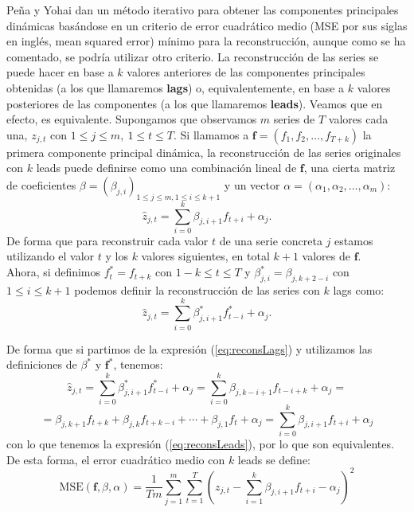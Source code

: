 Peña y Yohai dan un método iterativo para obtener las componentes principales dinámicas basándose en un criterio de error cuadrático medio (MSE por sus siglas en inglés, mean squared error) mínimo para la reconstrucción, aunque como se ha comentado, se podría utilizar otro criterio. La reconstrucción de las series se puede hacer en base a $k$ valores anteriores de las componentes principales obtenidas (a los que llamaremos \textbf{lags}) o, equivalentemente, en base a $k$ valores posteriores de las componentes (a los que llamaremos \textbf{leads}). Veamos que en efecto, es equivalente. Supongamos que observamos $m$ series de $T$ valores cada una, $z_{j,t}$ con $1 \leq j \leq m,\ 1 \leq t \leq T$. Si llamamos a $\mathbf{f} = (f_1, f_2, \dots, f_{T+k})$ la primera componente principal dinámica, la reconstrucción de las series originales con $k$ leads puede definirse como una combinación lineal de $\mathbf{f}$, una cierta matriz de coeficientes $\beta = (\beta_{j,i})_{1 \leq j \leq m, 1 \leq i \leq k+1}$ y un vector $\alpha = (\alpha_1, \alpha_2, \dots, \alpha_m)$:
\begin{equation}\label{eq:reconsLeads}
	\widehat{z}_{j,t} = \sum_{i=0}^k \beta_{j,i+1}f_{t+i} + \alpha_j.
\end{equation}
De forma que para reconstruir cada valor $t$ de una serie concreta $j$ estamos utilizando el valor $t$ y los $k$ valores siguientes, en total $k+1$ valores de $\mathbf{f}$.\\

Ahora, si definimos $f_t^* = f_{t+k}$ con $1-k \leq t \leq T$ y $\beta_{j,i}^* = \beta_{j, k+2-i}$ con $1 \leq i \leq k+1$ podemos definir la reconstrucción de las series con $k$ lags como:
\begin{equation}\label{eq:reconsLags}
	\widehat{z}_{j,t} = \sum_{i=0}^k \beta_{j,i+1}^*f_{t-i}^* + \alpha_j.
\end{equation}

De forma que si partimos de la expresión (\ref{eq:reconsLags}) y utilizamos las definiciones de $\beta^*$ y $\mathbf{f}^*$, tenemos:
\[	\widehat{z}_{j,t} = \sum_{i=0}^k \beta_{j,i+1}^*f_{t-i}^* + \alpha_j = \sum_{i=0}^k \beta_{j,k-i+1}f_{t-i+k} + \alpha_j	 = \]
\[ = \beta_{j,k+1}f_{t+k} + \beta_{j,k}f_{t+k-i} + \cdots + \beta_{j,1}f_t + \alpha_j = \sum_{i=0}^k \beta_{j,i+1}f_{t+i} + \alpha_j	\]
con lo que tenemos la expresión (\ref{eq:reconsLeads}), por lo que son equivalentes.\\

De esta forma, el error cuadrático medio con $k$ leads se define:
\begin{equation}\label{MSE}
\text{MSE}(\mathbf{f}, \beta, \alpha) = \frac{1}{Tm} \sum_{j=1}^m \sum_{t=1}^T (z_{j,t} - \sum_{i=1}^k \beta_{j,i+1}f_{t+i} - \alpha_j)^2
\end{equation}

